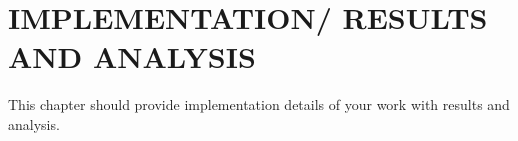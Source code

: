 
\chapter{\uppercase{Implementation/ Results and Analysis}} %
\label{chap5} %
This chapter should provide implementation details of your work with results and analysis. 